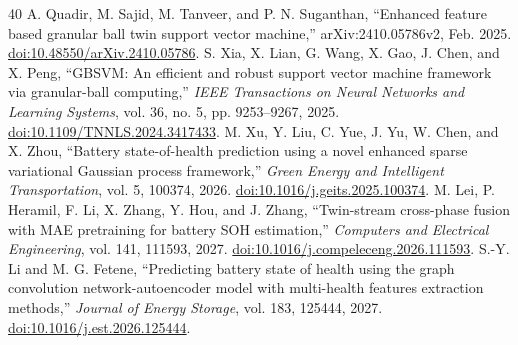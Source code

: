 \begin{thebibliography}{40}
 A. Quadir, M. Sajid, M. Tanveer, and P. N. Suganthan, ``Enhanced feature based granular ball twin support vector machine,'' arXiv:2410.05786v2, Feb. 2025. \href{https://doi.org/10.48550/arXiv.2410.05786}{doi:10.48550/arXiv.2410.05786}.
 S. Xia, X. Lian, G. Wang, X. Gao, J. Chen, and X. Peng, ``GBSVM: An efficient and robust support vector machine framework via granular-ball computing,'' \emph{IEEE Transactions on Neural Networks and Learning Systems}, vol. 36, no. 5, pp. 9253--9267, 2025. \href{https://doi.org/10.1109/TNNLS.2024.3417433}{doi:10.1109/TNNLS.2024.3417433}.
 M. Xu, Y. Liu, C. Yue, J. Yu, W. Chen, and X. Zhou, ``Battery state-of-health prediction using a novel enhanced sparse variational Gaussian process framework,'' \emph{Green Energy and Intelligent Transportation}, vol. 5, 100374, 2026. \href{https://doi.org/10.1016/j.geits.2025.100374}{doi:10.1016/j.geits.2025.100374}.
 M. Lei, P. Heramil, F. Li, X. Zhang, Y. Hou, and J. Zhang, ``Twin-stream cross-phase fusion with MAE pretraining for battery SOH estimation,'' \emph{Computers and Electrical Engineering}, vol. 141, 111593, 2027. \href{https://doi.org/10.1016/j.compeleceng.2026.111593}{doi:10.1016/j.compeleceng.2026.111593}.
 S.-Y. Li and M. G. Fetene, ``Predicting battery state of health using the graph convolution network-autoencoder model with multi-health features extraction methods,'' \emph{Journal of Energy Storage}, vol. 183, 125444, 2027. \href{https://doi.org/10.1016/j.est.2026.125444}{doi:10.1016/j.est.2026.125444}.
\end{thebibliography}
